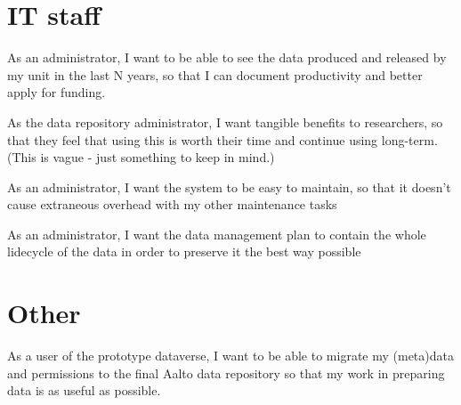 \section{IT staff}

\begin{compactitem}
    \item As an administrator, I want to be able to see the data produced and
          released by my unit in the last N years, so that I can document
          productivity and better apply for funding.
    \item As the data repository administrator, I want tangible benefits to
          researchers, so that they feel that using this is worth their time and
          continue using long-term.  (This is vague - just something to keep in
          mind.)
    \item As an administrator, I want the system to be easy to maintain, so
          that it doesn't cause extraneous overhead with my other maintenance
          tasks
    \item As an administrator, I want the data management plan to contain the
          whole lidecycle of the data in order to preserve it the best way
          possible
\end{compactitem}

\section{Other}

\begin{compactitem}
    \item As a user of the prototype dataverse, I want to be able to migrate my
          (meta)data and permissions to the final Aalto data repository so that
          my work in preparing data is as useful as possible.
\end{compactitem}




\iffalse
This is the first appendix. You could put some test images or verbose data in an
appendix, if there is too much data to fit in the actual text nicely.

For now, the Aalto logo variants are shown in Figure~\ref{fig:aaltologo}.

\begin{figure}
\begin{center}
 \begin{subfigure}[b]{\textwidth}
  {\selectlanguage{english}\AaltoLogoSmall{1}{!}{aaltoBlue}}
  \caption{In English}
 \end{subfigure}
 \begin{subfigure}[b]{\textwidth}
  {\selectlanguage{finnish}\AaltoLogoSmall{1}{''}{aaltoRed}}
  \caption{Suomeksi}
 \end{subfigure}
 \begin{subfigure}[b]{\textwidth}
  {\selectlanguage{swedish}\AaltoLogoSmall{1}{?}{aaltoYellow}}
  \caption{P\r{a} svenska}
 \end{subfigure}
\caption{Aalto logo variants}
\label{fig:aaltologo}
\end{center}
\end{figure}
\fi

